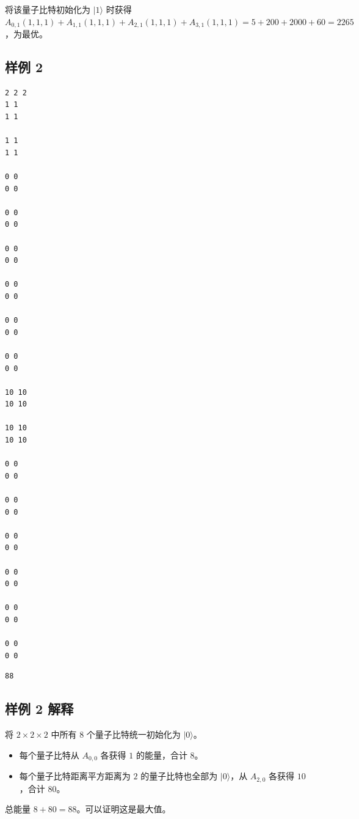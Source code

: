将该量子比特初始化为 $|1\rangle$ 时获得 $A_{0,1}(1,1,1) + A_{1,1}(1,1,1)+ A_{2,1}(1,1,1) + A_{3,1}(1,1,1) = 5 + 200 + 2000 + 60 = 2265$，为最优。

\subsection{样例 2}

\begin{minipage}{\linewidth}
	\begin{minipage}[t]{0.49\linewidth}
		\begin{lstlisting}[title=\texttt{standard input}]
2 2 2
1 1
1 1

1 1
1 1

0 0
0 0

0 0
0 0

0 0
0 0

0 0
0 0

0 0
0 0

0 0
0 0

10 10
10 10

10 10
10 10

0 0
0 0

0 0
0 0

0 0
0 0

0 0
0 0

0 0
0 0

0 0
0 0
\end{lstlisting}
	\end{minipage}
	\begin{minipage}[t]{0.49\linewidth}
		\begin{lstlisting}[title=\texttt{standard output}]
88
\end{lstlisting}
	\end{minipage}
\end{minipage}


\subsection{样例 2 解释}

将 $2 \times 2 \times 2$ 中所有 $8$ 个量子比特统一初始化为 $|0\rangle$。

\begin{itemize}
	\item 每个量子比特从 $A_{0,0}$ 各获得 $1$ 的能量，合计 $8$。
	\item 每个量子比特距离平方距离为 $2$ 的量子比特也全部为 $|0\rangle$，从 $A_{2,0}$ 各获得 $10$，合计 $80$。
\end{itemize}

总能量 $8 + 80 = 88$。可以证明这是最大值。
